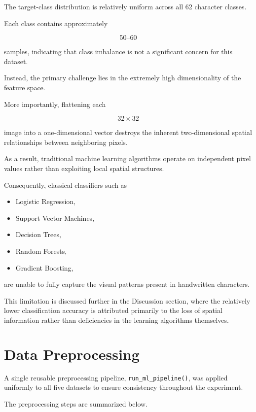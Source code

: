 \documentclass[12pt,a4paper]{article}
\begin{document}
The target-class distribution is relatively uniform across all
62 character classes.

Each class contains approximately

\[
50\text{--}60
\]

samples, indicating that class imbalance is not a significant concern for
this dataset.

Instead, the primary challenge lies in the extremely high dimensionality of
the feature space.

More importantly, flattening each

\[
32 \times 32
\]

image into a one-dimensional vector destroys the inherent two-dimensional
spatial relationships between neighboring pixels.

As a result, traditional machine learning algorithms operate on independent
pixel values rather than exploiting local spatial structures.

Consequently, classical classifiers such as

\begin{itemize}
    \item Logistic Regression,
    \item Support Vector Machines,
    \item Decision Trees,
    \item Random Forests,
    \item Gradient Boosting,
\end{itemize}

are unable to fully capture the visual patterns present in handwritten
characters.

This limitation is discussed further in the Discussion section, where the
relatively lower classification accuracy is attributed primarily to the
loss of spatial information rather than deficiencies in the learning
algorithms themselves.

\section{Data Preprocessing}

A single reusable preprocessing pipeline,
\texttt{run\_ml\_pipeline()}, was applied uniformly to all five datasets to
ensure consistency throughout the experiment.

The preprocessing steps are summarized below.
\end{document}
